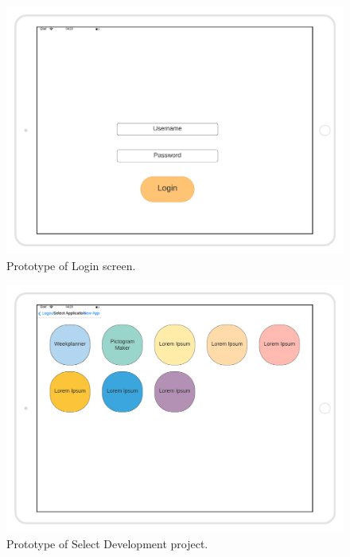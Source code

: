 \begin{figure}[H]
    \includegraphics[width=\textwidth]{images/Login-Mockup.png}
    \caption{Prototype of Login screen.}
\end{figure}

\begin{figure}[H]
    \includegraphics[width=\textwidth]{images/Select-App-Mockup.png}
    \caption{Prototype of Select Development project.}
\end{figure}


